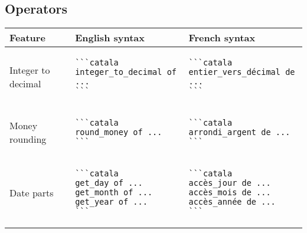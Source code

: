 \documentclass[a3paper,landscape]{article}
\begin{document}
\begin{multicols*}{2}
  \section*{Operators}
  \begin{center}
    \begin{tabular}{p{}p{}p{}}
      \toprule
      Feature                         & English syntax & French syntax \\\midrule
      Integer to decimal              &
      \vspace*{-1.75em}
      \begin{verbatim}
```catala
integer_to_decimal of ...
```
\end{verbatim}
      \vspace*{-1.75em}
                                      &
      \vspace*{-1.75em}
      \begin{verbatim}
```catala
entier_vers_décimal de ...
```
\end{verbatim}
      \vspace*{-1.75em}
      \\
      Money rounding                  &
      \vspace*{-1.75em}
      \begin{verbatim}
```catala
round_money of ...
```
\end{verbatim}
      \vspace*{-1.75em}
                                      &
      \vspace*{-1.75em}
      \begin{verbatim}
```catala
arrondi_argent de ...
```
\end{verbatim}
      \vspace*{-1.75em}
      \\
      Date parts                      &
      \vspace*{-1.75em}
      \begin{verbatim}
```catala
get_day of ...
get_month of ...
get_year of ...
```
\end{verbatim}
      \vspace*{-1.75em}
                                      &
      \vspace*{-1.75em}
      \begin{verbatim}
```catala
accès_jour de ...
accès_mois de ...
accès_année de ...
```
\end{verbatim}
      \vspace*{-1.75em}

\end{tabular}
\end{center}
\end{multicols*}
\end{document}

